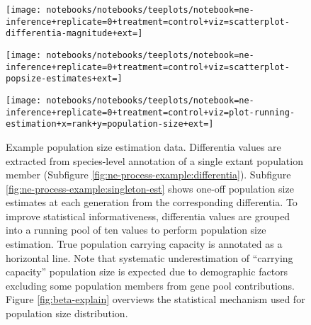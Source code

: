 \begin{figure}
  \centering

  \begin{minipage}{.65\textwidth}
    \centering
    \texttt{[image: notebooks/notebooks/teeplots/notebook=ne-inference+replicate=0+treatment=control+viz=scatterplot-differentia-magnitude+ext=]}
  \end{minipage}%
  \begin{minipage}{.25\textwidth}
    \label{fig:ne-process-example:differentia}
  \end{minipage}

  \vspace{0.25em}

  \begin{minipage}{.65\textwidth}
    \centering
    \texttt{[image: notebooks/notebooks/teeplots/notebook=ne-inference+replicate=0+treatment=control+viz=scatterplot-popsize-estimates+ext=]}
  \end{minipage}%
  \begin{minipage}{.25\textwidth}
    \label{fig:ne-process-example:singleton-est}
  \end{minipage}

  \vspace{0.25em}

  \begin{minipage}{.65\textwidth}
    \centering
    \texttt{[image: notebooks/notebooks/teeplots/notebook=ne-inference+replicate=0+treatment=control+viz=plot-running-estimation+x=rank+y=population-size+ext=]}
  \end{minipage}%
  \begin{minipage}{.25\textwidth}
    \label{fig:ne-process-example:running-est}
  \end{minipage}

  \caption{
    Example population size estimation data.
    Differentia values are extracted from species-level annotation of a single extant population member (Subfigure \ref{fig:ne-process-example:differentia}).
    Subfigure \ref{fig:ne-process-example:singleton-est} shows one-off population size estimates at each generation from the corresponding differentia.
    To improve statistical informativeness, differentia values are grouped into a running pool of ten values to perform population size estimation.
    True population carrying capacity is annotated as a horizontal line.
    Note that systematic underestimation of ``carrying capacity'' population size is expected due to demographic factors excluding some population members from gene pool contributions.
    Figure \ref{fig:beta-explain} overviews the statistical mechanism used for population size distribution.
  }
  \label{fig:ne-process-example}
\end{figure}



